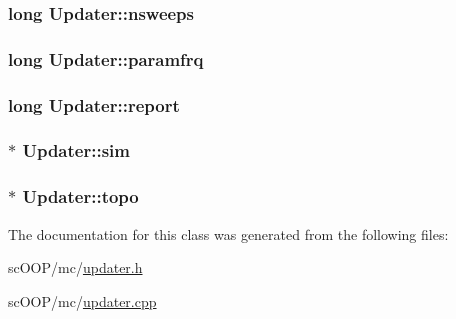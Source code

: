 \hypertarget{class_updater_aabcc5bfefc334a9514c481f31bcf9c06}{
\subsubsection[{nsweeps}]{\setlength{\rightskip}{0pt plus 5cm}long Updater\+::nsweeps\hspace{0.3cm}{\ttfamily [private]}}}\label{class_updater_aabcc5bfefc334a9514c481f31bcf9c06}
\hypertarget{class_updater_ab992a0a03d5ff6a550596d457e3df5b8}{
\subsubsection[{paramfrq}]{\setlength{\rightskip}{0pt plus 5cm}long Updater\+::paramfrq\hspace{0.3cm}{\ttfamily [private]}}}\label{class_updater_ab992a0a03d5ff6a550596d457e3df5b8}
\hypertarget{class_updater_a3dc9b09abafeebacf23cd7c7d17f5655}{
\subsubsection[{report}]{\setlength{\rightskip}{0pt plus 5cm}long Updater\+::report\hspace{0.3cm}{\ttfamily [private]}}}\label{class_updater_a3dc9b09abafeebacf23cd7c7d17f5655}
\hypertarget{class_updater_a0436d5371f3fdc707e323b84ea7356fe}{
\subsubsection[{sim}]{$\ast$ Updater\+::sim\hspace{0.3cm}{\ttfamily [private]}}}\label{class_updater_a0436d5371f3fdc707e323b84ea7356fe}
\hypertarget{class_updater_a2ac7e890d9b19cd1c8074ef5e2b8fd14}{
\subsubsection[{topo}]{$\ast$ Updater\+::topo\hspace{0.3cm}{\ttfamily [private]}}}\label{class_updater_a2ac7e890d9b19cd1c8074ef5e2b8fd14}


The documentation for this class was generated from the following files\+:\begin{DoxyCompactItemize}
\item 
sc\+O\+O\+P/mc/\hyperlink{updater_8h}{updater.\+h}\item 
sc\+O\+O\+P/mc/\hyperlink{updater_8cpp}{updater.\+cpp}\end{DoxyCompactItemize}

